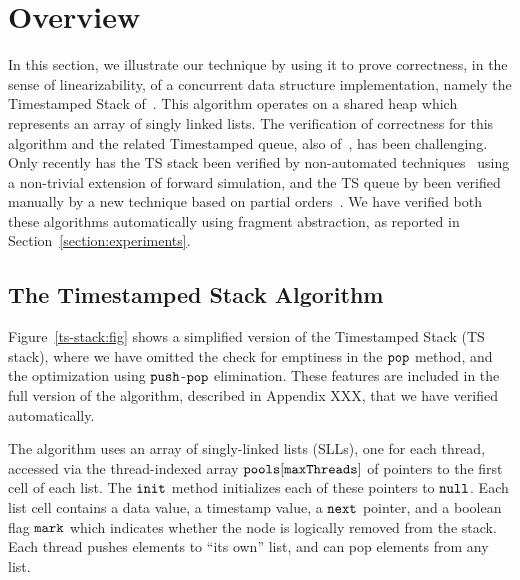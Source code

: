 \section{Overview}
\label{sec:overview}

In this section, we illustrate our technique by using it to prove correctness, in
the sense of linearizability, of
a concurrent data structure implementation, namely the Timestamped Stack
of~\cite{ts-stack}. This algorithm operates on a shared heap which represents
an array of singly linked lists.
The verification of correctness for this algorithm and the related
Timestamped queue, also of~\cite{ts-stack}, has been challenging. Only
recently has the TS stack been verified by non-automated
techniques~\cite{bouajjani:icalp17:rep} using a non-trivial extension of
forward simulation, and the TS queue by been verified manually by a new technique
based on partial orders~\cite{ts-stack}.
We have verified both these algorithms automatically using fragment abstraction,
as reported in Section~\ref{section:experiments}.

\subsection{The Timestamped Stack Algorithm}



Figure~\ref{ts-stack:fig} shows a simplified version of the Timestamped Stack (TS stack), where we have omitted the check for emptiness in the ${\tt pop}$ method, and the optimization using ${\tt push}$-${\tt pop}$ elimination. These features are included in the full version of the algorithm, described in Appendix XXX, that we have verified automatically.

The algorithm uses an array of singly-linked lists (SLLs), one for each thread, accessed via the thread-indexed array ${\tt pools[maxThreads]}$ of pointers to the first cell of each list. The ${\tt init}$ method initializes each of these pointers to ${\tt null}$. Each list cell contains a data value, a timestamp value, a ${\tt next}$ pointer, and a boolean flag ${\tt mark}$ which indicates whether the node is logically removed from the stack. Each thread pushes elements to ``its own'' list, and can pop elements from any list.

